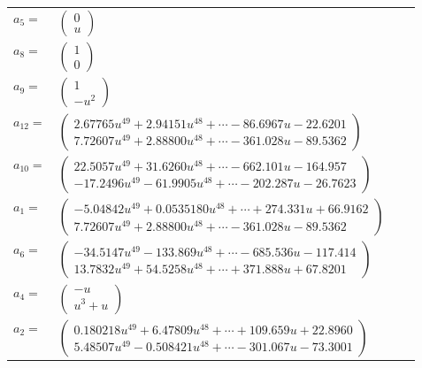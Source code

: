 \documentclass[1p]{elsarticle_modified}
\theoremstyle{definition}
\begin{document}
\begin{tabular}{m{7pt} m{180pt} m{7pt} m{180pt} }
\flushright $a_{5}=$&$\begin{pmatrix}0\\u\end{pmatrix}$ \\
\flushright $a_{8}=$&$\begin{pmatrix}1\\0\end{pmatrix}$ \\
\flushright $a_{9}=$&$\begin{pmatrix}1\\- u^2\end{pmatrix}$ \\
\flushright $a_{12}=$&$\begin{pmatrix}2.67765 u^{49}+2.94151 u^{48}+\cdots-86.6967 u-22.6201\\7.72607 u^{49}+2.88800 u^{48}+\cdots-361.028 u-89.5362\end{pmatrix}$ \\
\flushright $a_{10}=$&$\begin{pmatrix}22.5057 u^{49}+31.6260 u^{48}+\cdots-662.101 u-164.957\\-17.2496 u^{49}-61.9905 u^{48}+\cdots-202.287 u-26.7623\end{pmatrix}$ \\
\flushright $a_{1}=$&$\begin{pmatrix}-5.04842 u^{49}+0.0535180 u^{48}+\cdots+274.331 u+66.9162\\7.72607 u^{49}+2.88800 u^{48}+\cdots-361.028 u-89.5362\end{pmatrix}$ \\
\flushright $a_{6}=$&$\begin{pmatrix}-34.5147 u^{49}-133.869 u^{48}+\cdots-685.536 u-117.414\\13.7832 u^{49}+54.5258 u^{48}+\cdots+371.888 u+67.8201\end{pmatrix}$ \\
\flushright $a_{4}=$&$\begin{pmatrix}- u\\u^3+u\end{pmatrix}$ \\
\flushright $a_{2}=$&$\begin{pmatrix}0.180218 u^{49}+6.47809 u^{48}+\cdots+109.659 u+22.8960\\5.48507 u^{49}-0.508421 u^{48}+\cdots-301.067 u-73.3001\end{pmatrix}$ \\

\end{tabular}
\end{document}
